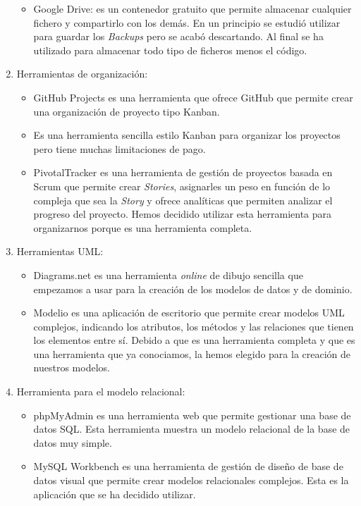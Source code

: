 \documentclass[11pt]{article}
\begin{document}
\begin{enumerate}
\begin{itemize}
		\item Google Drive: es un contenedor gratuito que permite almacenar cualquier fichero y compartirlo con los demás. En un principio se estudió utilizar para guardar los \textit{Backups} pero se acabó descartando. Al final se ha utilizado para almacenar todo tipo de ficheros menos el código.
	\end{itemize}
	\item Herramientas de organización: 
	\begin{itemize} 
		\item GitHub Projects es una herramienta que ofrece GitHub que permite crear una organización de proyecto tipo Kanban.
		\item Es una herramienta sencilla estilo Kanban para organizar los proyectos pero tiene muchas limitaciones de pago.
		\item PivotalTracker es una herramienta de gestión de proyectos basada en Scrum que permite crear \textit{Stories}, asignarles un peso en función de lo compleja que sea la \textit{Story} y ofrece analíticas que permiten analizar el progreso del proyecto. Hemos decidido utilizar esta herramienta para organizarnos porque es una herramienta completa.
	\end{itemize}
	\item Herramientas UML: 
	\begin{itemize} 
		\item Diagrams.net es una herramienta \textit{online} de dibujo sencilla que empezamos a usar para la creación de los modelos de datos y de dominio.
		\item Modelio es una aplicación de escritorio que permite crear modelos UML complejos, indicando los atributos, los métodos y las relaciones que tienen los elementos entre sí. Debido a que es una herramienta completa y que es una herramienta que ya conociamos, la hemos elegido para la creación de nuestros modelos.
	\end{itemize}
	\item Herramienta para el modelo relacional: 
	\begin{itemize} 
		\item phpMyAdmin es una herramienta web que permite gestionar una base de datos SQL. Esta herramienta muestra un modelo relacional de la base de datos muy simple.
		\item MySQL Workbench es una herramienta de gestión de diseño de base de datos visual que permite crear modelos relacionales complejos. Esta es la aplicación que se ha decidido utilizar.
	\end{itemize}

\end{enumerate}
\end{document}
